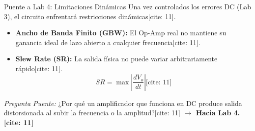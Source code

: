 \documentclass[aspectratio=169, xcolor={table,xcdraw}]{beamer}
\begin{document}
\begin{frame}{Puente a Lab 4: Limitaciones Dinámicas}
    Una vez controlados los errores DC (Lab 3), el circuito enfrentará restricciones dinámicas[cite: 11].
    
    \begin{itemize}
        \item \textbf{Ancho de Banda Finito (GBW):} El Op-Amp real no mantiene su ganancia ideal de lazo abierto a cualquier frecuencia[cite: 11].
        \item \textbf{Slew Rate (SR):} La salida física no puede variar arbitrariamente rápido[cite: 11].
        \begin{equation*}
            SR = \max\left|\frac{dV_o}{dt}\right| \text{[cite: 11]}
        \end{equation*}
    \end{itemize}
    \textit{Pregunta Puente:} ¿Por qué un amplificador que funciona en DC produce salida distorsionada al subir la frecuencia o la amplitud?[cite: 11] \textbf{$\rightarrow$ Hacia Lab 4.[cite: 11]}
\end{frame}
\end{document}
